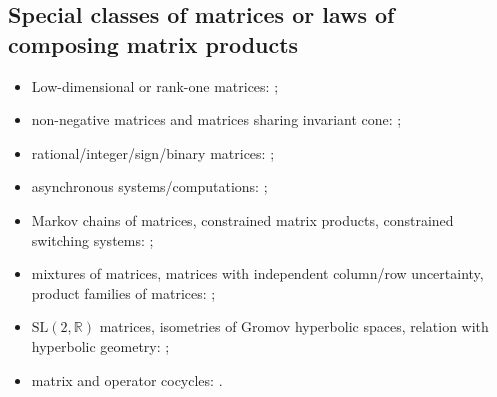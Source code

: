 \documentclass[a4paper,fleqn]{article}
\let\cite=\citep
\begin{document}
\subsection*{Special classes of matrices or laws of composing matrix products}
\begin{itemize}
  \item Low-dimensional or rank-one matrices: \cite{ABY:CMH10, ASU:I11,
      AKKK:92:e, AvilaRob:JMD09, BB:TCS02, CGSZ:LAA10, Dai:ArXiv11,
      DHLX:LAA12, FayKri:N08, Klep:AIT85:e, JM:LAA13, LiuXiao:LNCS12,
      LuiOli:AMC14, Morris:ArXiv11, Moss:ACM10, Saouter:inria96, Yoc:MDSA04};
  \item non-negative matrices and matrices sharing invariant cone:
    \cite{Alpin:MZ10, Bui:LAA22, BZ:AMPA18, CACJ:DLT19, CACJ:FI21,
      GhaAna:TCS05, GSM:IEEETAC07, JPB:LAA08, Jungers:LAA12, LP:LAA27,
      NesPro:SIAMJMAA13, PJB:SIAMJMAA10, Prot:RMS10, ProtCvet:MP20,
      ProtVoyn:LAA12, Thomas:ArXiv10, RSS:LAA10};
  \item rational/integer/sign/binary matrices: \cite{BC:TCS03, BCH:SF16,
      BT:SCL00, BT:IPL97, BB:TCS02, CGSZ:LAA10, CiconePhD11, JB:LAA08,
      JPB:LAA08, PanScl:Nonlin21, TB:MCSS97:1};
  \item asynchronous systems/computations: \cite{AKKK:92:e, AKKK:MCM90,
      ADFP:93, AKKKP:88, ChM:LAA69, FroSpi01, FromSzyld:JCAM00, Klep:AIT85:e,
      Koz:AiT90:10:e, Koz:AiT90:8:e, Koz:DAN90:311:e, Koz:AiT91:e,
      LubMit:JACM86, SBKK:LAA98};
  \item Markov chains of matrices, constrained matrix products, constrained
    switching systems: \cite{ASJ:IEEECSL17, Dai:LAA12, DHH:ArXiv14,
      DRD:IEEETAC18, GhaAna:TCS05, Koz:LAA14, Koz:LAA14:2, MOS:LAA07,
      PEDJ:Autom16, PhilJung:ICHS15, XuAci:IEEETAC20, ZhangXu:ArXiv20,
      ZSD:CCC21};
  \item mixtures of matrices, matrices with independent column/row uncertainty,
    product families of matrices: \cite{ACDDHK:STACS15, AGM:ArXiv24,
      AGMM:CDC25, AKKK:92:e, BN:SIAMJMAA09, KKKK:AiT83:7:e, KKKK:AiT84:3:e,
      KKKK:AiT84:8:e, KKKK:DAN84:e, Koz:BCRI03-13, Koz:LAA16, Koz:WSDV16,
      Koz:LMA17, Koz:DCDSB19, Koz:INFOPROC16:e, NesPro:SIAMJMAA13};
  \item $\textrm{SL}(2,\mathbb{R})$ matrices, isometries of
    Gromov hyperbolic spaces, relation with hyperbolic geometry:
    \cite{ABY:CMH10, AvilaRob:JMD09, BF:AIF21, BochiRams:JMD16, 
      BreSert:LMS21, FayKri:N08, Gao:ArXiv25, Gao:BLMS26, Oreg-Reyes:MastThes18,
      Oreg-Reyes:GGD18, PanScl:Nonlin21, Yoc:MDSA04, ZCL:DCDSA18};
  \item matrix and operator cocycles: \cite{ABY:CMH10, BD:StochDyn21,
      Bochi:PAMS26, DHX:ArXiv13:1, Morris:JFA12, Yoc:MDSA04}.
\end{itemize}
\end{document}
